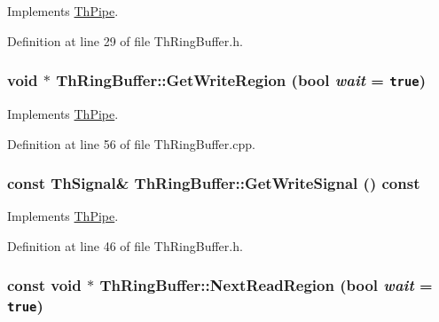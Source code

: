 Implements \hyperlink{class_th_pipe_d2327f51f3cda813c426e9291b706edc}{ThPipe}.

Definition at line 29 of file ThRingBuffer.h.\hypertarget{class_th_ring_buffer_6a921c362dd2cfe8173f065c884f34ac}{
\subsubsection[{GetWriteRegion}]{\setlength{\rightskip}{0pt plus 5cm}void $\ast$ ThRingBuffer::GetWriteRegion (bool {\em wait} = {\tt true})}}
\label{class_th_ring_buffer_6a921c362dd2cfe8173f065c884f34ac}




Implements \hyperlink{class_th_pipe_1a4ac6e97ef560473d9a400b744c5ece}{ThPipe}.

Definition at line 56 of file ThRingBuffer.cpp.\hypertarget{class_th_ring_buffer_bc8836a944eb477e1f3e7b505d589ac9}{
\subsubsection[{GetWriteSignal}]{\setlength{\rightskip}{0pt plus 5cm}const {\bf ThSignal}\& ThRingBuffer::GetWriteSignal () const}}
\label{class_th_ring_buffer_bc8836a944eb477e1f3e7b505d589ac9}




Implements \hyperlink{class_th_pipe_ec482a45f880a2c701c13356ffa81f52}{ThPipe}.

Definition at line 46 of file ThRingBuffer.h.\hypertarget{class_th_ring_buffer_fb5a911ce0ebb981ce95557101b84a83}{
\subsubsection[{NextReadRegion}]{\setlength{\rightskip}{0pt plus 5cm}const void $\ast$ ThRingBuffer::NextReadRegion (bool {\em wait} = {\tt true})}}
\label{class_th_ring_buffer_fb5a911ce0ebb981ce95557101b84a83}




